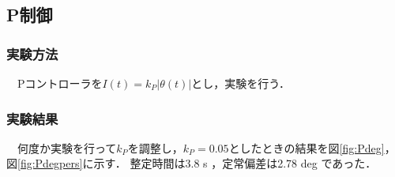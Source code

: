 \newpage

\subsection{P制御}
\subsubsection{実験方法}
　Pコントローラを$I(t) = k_P |\theta(t)|$とし，実験を行う．

\subsubsection{実験結果}
　何度か実験を行って$k_P$を調整し，$k_P=0.05$としたときの結果を図\ref{fig:Pdeg}，図\ref{fig:Pdegpers}に示す．
整定時間は3.8 s ，定常偏差は2.78 deg であった．

